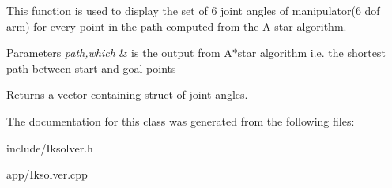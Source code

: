 This function is used to display the set of 6 joint angles of manipulator(6 dof arm) for every point in the path computed from the A star algorithm. 


\begin{DoxyParams}{Parameters}
{\em path,which} & is the output from A$\ast$star algorithm i.\+e. the shortest path between start and goal points \\
\hline
\end{DoxyParams}
\begin{DoxyReturn}{Returns}
a vector containing struct of joint angles. 
\end{DoxyReturn}


The documentation for this class was generated from the following files\+:\begin{DoxyCompactItemize}
\item 
include/Iksolver.\+h\item 
app/Iksolver.\+cpp\end{DoxyCompactItemize}
